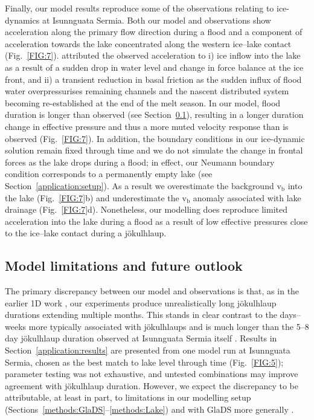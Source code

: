 \documentclass[tc, manuscript]{copernicus}
\begin{document}
Finally, our model results reproduce some of the observations relating to ice-dynamics at Isunnguata Sermia. Both our model and observations show acceleration along the primary flow direction during a flood and a component of acceleration towards the lake concentrated along the western ice--lake contact (Fig.~\ref{FIG:7}). \citet{livingstone2025ice} attributed the observed acceleration to i) ice inflow into the lake as a result of a sudden drop in water level and change in force balance at the ice front, and ii) a transient reduction in basal friction as the sudden influx of flood water overpressurises remaining channels and the nascent distributed system becoming re-established at the end of the melt season. In our model, flood duration is longer than observed (see Section~\ref{discussion:limitations}), resulting in a longer duration change in effective pressure and thus a more muted velocity response than is observed (Fig.~\ref{FIG:7}). In addition, the boundary conditions in our ice-dynamic solution remain fixed through time and we do not simulate the change in frontal forces as the lake drops during a flood; in effect, our Neumann boundary condition corresponds to a permanently empty lake (see Section~\ref{application:setup}). As a result we overestimate the background $\mathrm{v}_{\mathrm{b}}$ into the lake (Fig.~\ref{FIG:7}b) and underestimate the $\mathrm{v}_{\mathrm{b}}$ anomaly associated with lake drainage (Fig.~\ref{FIG:7}d). Nonetheless, our modelling does reproduce limited acceleration into the lake during a flood as a result of low effective pressures close to the ice--lake contact during a jökulhlaup. 


\subsection{Model limitations and future outlook}\label{discussion:limitations}

The primary discrepancy between our model and observations is that, as in the earlier 1D work \citep[e.g.,][]{kingslake2013modelling}, our experiments produce unrealistically long jökulhlaup durations extending multiple months. This stands in clear contrast to the days--weeks more typically associated with jökulhlaups \citep[e.g.,][]{bjornsson1992jokulhlaups,bjornsson2010understanding,einarsson2016spectrum,magnusson2026subglacial} and is much longer than the 5--8 day jökulhlaup duration observed at Isunnguata Sermia itself \citep{livingstone2025ice}. Results in Section~\ref{application:results} are presented from one model run at Isunnguata Sermia, chosen as the best match to lake level through time (Fig.~\ref{FIG:5}); parameter testing was not exhaustive, and untested combinations may improve agreement with jökulhlaup duration. However, we expect the discrepancy to be attributable, at least in part, to limitations in our modelling setup (Sections~\ref{methods:GlaDS}--\ref{methods:Lake}) and with GlaDS more generally \citep{werder2013modeling}. 
\end{document}
